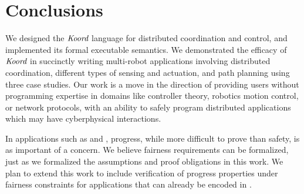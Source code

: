 \section{Conclusions}
\label{sec:conclusion}

We designed the $\emph{Koord}$ language  for distributed coordination and control, and implemented its formal executable semantics. We demonstrated the efficacy of $\emph{Koord}$ in succinctly writing multi-robot applications involving distributed coordination, different types of sensing and actuation, and path planning using three case studies.  Our work is a move in the direction of providing users without programming expertise in domains like controller theory, robotics motion control, or network protocols, with an ability to safely program distributed applications which may have cyberphysical interactions.

In applications such as \Task and \dmap, progress, while more difficult to prove than safety, is as important of a concern. We believe fairness requirements can be formalized, just as we formalized the assumptions and proof obligations in this work. We plan to extend this work to include verification of progress properties under fairness constraints for applications that can already be encoded in \lgname.